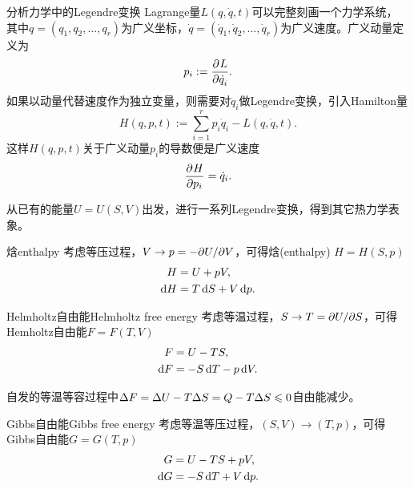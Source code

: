 \begin{example}{分析力学中的Legendre变换}{}
	Lagrange量$L(q,\dot q,t)$可以完整刻画一个力学系统，
	其中$q=(q_1,q_2,\ldots,q_r)$为广义坐标，$\dot q=(\dot q_1,\dot q_2,\ldots,\dot q_r)$为广义速度。广义动量定义为
	\[
		p_i:=\frac{\partial^{{}}L}{\partial{\dot q_i}^{{}}}.
	\]
	如果以动量代替速度作为独立变量，则需要对$\dot q_i$做Legendre变换，引入Hamilton量
	\begin{equation}
		H(q,p,t):=\sum_{i=1}^rp_i\dot q_i-L(q,\dot q,t).
	\end{equation}
	这样$H(q,p,t)$关于广义动量$p_i$的导数便是广义速度
	\[
		\frac{\partial^{{}}H}{\partial{p_i}^{{}}}=\dot q_i.
	\]
\end{example}

从已有的能量$U=U(S,V)$出发，进行一系列Legendre变换，得到其它热力学表象。

\begin{definition}
	{焓}{enthalpy}
	考虑等压过程，$V\to p=-\partial U/\partial V$，可得焓(enthalpy) $H=H(S,p)$
	\begin{subequations}
		\begin{align}
			H&=U+pV,\\
			\mathop{}\!\mathrm{d} H&=T\mathop{}\!\mathrm{d} S+V\mathop{}\!\mathrm{d} p.
		\end{align}
	\end{subequations}
\end{definition}

\begin{definition}
	{Helmholtz自由能}{Helmholtz free energy}
	考虑等温过程，$S\to T=\partial U/\partial S$，可得Hemholtz自由能$F=F(T,V)$
	\begin{subequations}
		\begin{align}
			F&=U-TS,\\
			\mathop{}\!\mathrm{d} F&=-S\mathop{}\!\mathrm{d} T-p\mathop{}\!\mathrm{d} V.
		\end{align}
	\end{subequations}
\end{definition}

\begin{corollary}
	自发的等温等容过程中$\Delta F=\Delta U-T\Delta S=Q-T\Delta S\leqslant 0$自由能减少。
\end{corollary}

\begin{definition}
	{Gibbs自由能}{Gibbs free energy}
	考虑等温等压过程，$(S,V)\to(T,p)$，可得Gibbs自由能$G=G(T,p)$
	\begin{subequations}
		\begin{align}
			G&=U-TS+pV,\\
			\mathop{}\!\mathrm{d} G&=-S\mathop{}\!\mathrm{d} T+V\mathop{}\!\mathrm{d} p.
		\end{align}
	\end{subequations}
\end{definition}

